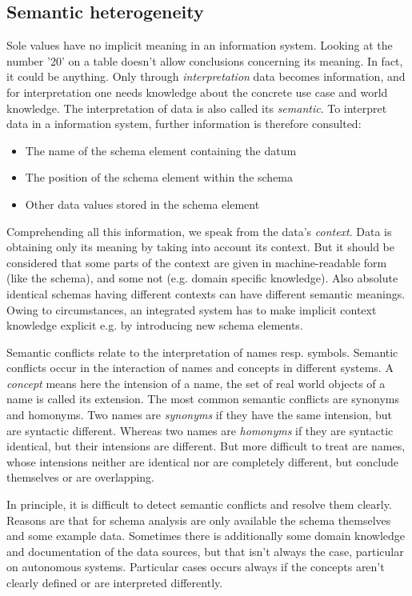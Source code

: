 \subsection{Semantic  heterogeneity}
Sole values have no implicit meaning in an information system. Looking at the number '20' on a table doesn't allow conclusions concerning its meaning. In fact, it could be anything. Only through \textit{interpretation} data becomes information, and for interpretation one needs knowledge about the concrete use case and world knowledge. The interpretation of data is also called its \textit{semantic}. To interpret data in a information system, further information is therefore consulted:
\begin{itemize}
\item The name of the schema element containing the datum
\item The position of the schema element within the schema
\item Other data values stored in the schema element
\end{itemize}
Comprehending all this information, we speak from the data's \textit{context}. Data is obtaining only its meaning by taking into account its context. But it should be considered that some parts of the context are given in machine-readable form (like the schema), and some not (e.g. domain specific knowledge). Also absolute identical schemas having different contexts can have different semantic meanings. Owing to circumstances, an integrated system has to make implicit context knowledge explicit e.g. by introducing new schema elements.

Semantic conflicts relate to the interpretation of names resp. symbols. Semantic conflicts occur in the interaction of names and concepts in different systems. A \textit{concept} means here the intension of a name, the set of real world objects of a name is called its extension. The most common semantic conflicts are synonyms and homonyms. Two names are \textit{synonyms} if they have the same intension, but are syntactic different. Whereas two names are \textit{homonyms} if they are syntactic identical, but their intensions are different. But more difficult to treat are names, whose intensions neither are identical nor are completely different, but conclude themselves or are overlapping.

In principle, it is difficult to detect semantic conflicts and resolve them clearly. Reasons are that for schema analysis are only available the schema themselves and some example data. Sometimes there is additionally some domain knowledge and documentation of the data sources, but that isn't always the case, particular on autonomous systems. Particular cases occurs always if the concepts aren't clearly defined or are interpreted differently. 

